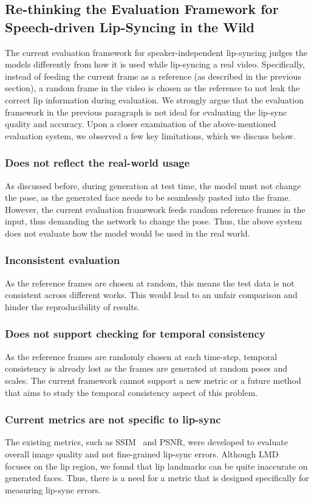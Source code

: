 \documentclass[sigconf]{acmart}
\begin{document}
\subsection{Re-thinking the Evaluation Framework for Speech-driven Lip-Syncing in the Wild}
The current evaluation framework for speaker-independent lip-syncing judges the models differently from how it is used while lip-syncing a real video. Specifically, instead of feeding the current frame as a reference (as described in the previous section), a random frame in the video is chosen as the reference to not leak the correct lip information during evaluation. We strongly argue that the evaluation framework in the previous paragraph is not ideal for evaluating the lip-sync quality and accuracy. Upon a closer examination of the above-mentioned evaluation system, we observed a few key limitations, which we discuss below. 

\subsubsection{Does not reflect the real-world usage} As discussed before, during generation at test time, the model must not change the pose, as the generated face needs to be seamlessly pasted into the frame. However, the current evaluation framework feeds random reference frames in the input, thus demanding the network to change the pose. Thus, the above system does not evaluate how the model would be used in the real world.

\subsubsection{Inconsistent evaluation} As the reference frames are chosen at random, this means the test data is not consistent across different works. This would lead to an unfair comparison and hinder the reproducibility of results.

\subsubsection{Does not support checking for temporal consistency}
As the reference frames are randomly chosen at each time-step, temporal consistency is already lost as the frames are generated at random poses and scales. The current framework cannot support a new metric or a future method that aims to study the temporal consistency aspect of this problem. 

\subsubsection{Current metrics are not specific to lip-sync}
The existing metrics, such as SSIM~\cite{wang2004image} and PSNR, were developed to evaluate overall image quality and not fine-grained lip-sync errors. Although LMD~\cite{chen2018lip} focuses on the lip region, we found that lip landmarks can be quite inaccurate on generated faces. Thus, there is a need for a metric that is designed specifically for measuring lip-sync errors. 
\end{document}
